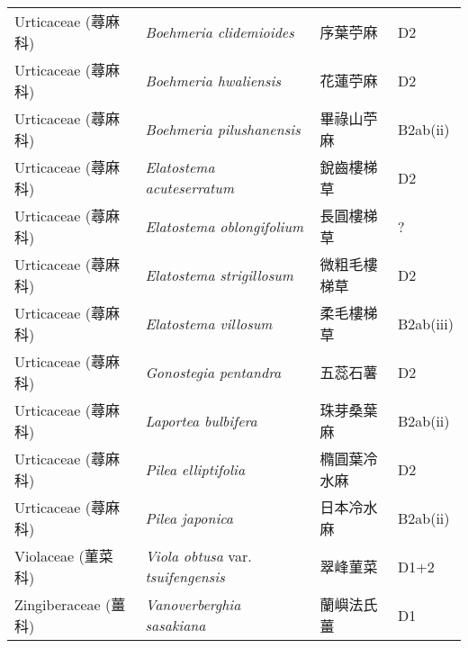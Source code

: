 \begin{longtable}{p{3cm}p{5cm}p{3cm}p{4cm}}
    Urticaceae (蕁麻科) & \textit{Boehmeria clidemioides}  & 序葉苧麻 & D2 \index{Boehmeria@\textit{Boehmeria}!clidemioides@\textit{clidemioides}}  \index{序葉苧麻} \\
    Urticaceae (蕁麻科) & \textit{Boehmeria hwaliensis}  & 花蓮苧麻 & D2 \index{Boehmeria@\textit{Boehmeria}!hwaliensis@\textit{hwaliensis}}  \index{花蓮苧麻} \\
    Urticaceae (蕁麻科) & \textit{Boehmeria pilushanensis}  & 畢祿山苧麻 & B2ab(ii) \index{Boehmeria@\textit{Boehmeria}!pilushanensis@\textit{pilushanensis}}  \index{畢祿山苧麻} \\
    Urticaceae (蕁麻科) & \textit{Elatostema acuteserratum}  & 銳齒樓梯草 & D2 \index{Elatostema@\textit{Elatostema}!acuteserratum@\textit{acuteserratum}}  \index{銳齒樓梯草} \\
    Urticaceae (蕁麻科) & \textit{Elatostema oblongifolium}  & 長圓樓梯草 & ? \index{Elatostema@\textit{Elatostema}!oblongifolium@\textit{oblongifolium}}  \index{長圓樓梯草} \\
    Urticaceae (蕁麻科) & \textit{Elatostema strigillosum}  & 微粗毛樓梯草 & D2 \index{Elatostema@\textit{Elatostema}!strigillosum@\textit{strigillosum}}  \index{微粗毛樓梯草} \\
    Urticaceae (蕁麻科) & \textit{Elatostema villosum}  & 柔毛樓梯草 & B2ab(iii) \index{Elatostema@\textit{Elatostema}!villosum@\textit{villosum}}  \index{柔毛樓梯草} \\
    Urticaceae (蕁麻科) & \textit{Gonostegia pentandra}  & 五蕊石薯 & D2 \index{Gonostegia@\textit{Gonostegia}!pentandra@\textit{pentandra}}  \index{五蕊石薯} \\
    Urticaceae (蕁麻科) & \textit{Laportea bulbifera}  & 珠芽桑葉麻 & B2ab(ii) \index{Laportea@\textit{Laportea}!bulbifera@\textit{bulbifera}}  \index{珠芽桑葉麻} \\
    Urticaceae (蕁麻科) & \textit{Pilea elliptifolia}  & 橢圓葉冷水麻 & D2 \index{Pilea@\textit{Pilea}!elliptifolia@\textit{elliptifolia}}  \index{橢圓葉冷水麻} \\
    Urticaceae (蕁麻科) & \textit{Pilea japonica}  & 日本冷水麻 & B2ab(ii) \index{Pilea@\textit{Pilea}!japonica@\textit{japonica}}  \index{日本冷水麻} \\
    Violaceae (菫菜科) & \textit{Viola obtusa} var. \textit{tsuifengensis}  & 翠峰菫菜 & D1+2 \index{Viola@\textit{Viola}!obtusa@\textit{obtusa}!var. tsuifengensis@var. \textit{tsuifengensis}}  \index{翠峰菫菜} \\
    Zingiberaceae (薑科) & \textit{Vanoverberghia sasakiana}  & 蘭嶼法氏薑 & D1 \index{Vanoverberghia@\textit{Vanoverberghia}!sasakiana@\textit{sasakiana}}  \index{蘭嶼法氏薑} \\
    \bottomrule
        \end{longtable}
